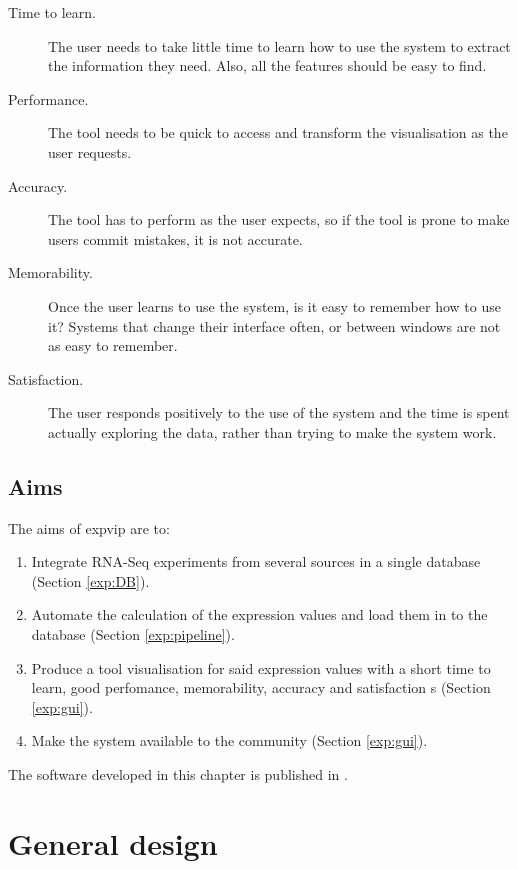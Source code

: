 \begin{description}
\item[Time to learn.] The user needs to take little time to learn how to use the system to extract the information they need. Also, all the features should be easy to find.
\item[Performance.] The tool needs to be quick to access and transform the visualisation as the user requests.
\item[Accuracy.] The tool has to perform as the user expects, so if the tool is prone to make users commit mistakes, it is not accurate. 
\item[Memorability.] Once the user learns to use the system, is it easy to remember how to use it? Systems that change their interface often, or between windows are not as easy to remember. 
\item[Satisfaction.] The user responds positively to the use of the system and the time is spent actually exploring the data, rather than trying to make the system work. 
\end{description}

\subsection{Aims}
\label{exp:aims}
The aims of \gls{expvip} are to:
\begin{enumerate}
\item Integrate RNA-Seq experiments from several sources in a single database (Section \ref{exp:DB}). 
\item Automate the calculation of the expression values and load them in to the database (Section \ref{exp:pipeline}).
\item Produce a tool  visualisation for said expression values with a short time to learn, good perfomance, memorability, accuracy and satisfaction s (Section \ref{exp:gui}).
\item Make the system available to the community (Section \ref{exp:gui}).
\end{enumerate}

The software developed in this chapter is published in \cite*{Borrill2016}. 

\section{General design}

